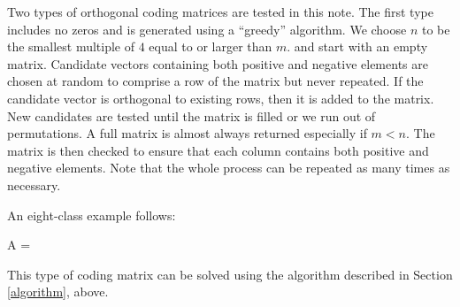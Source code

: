 
{\revision Two types of orthogonal coding matrices are tested in this note.
The first type includes no zeros and is generated
using a ``greedy'' algorithm.}
We choose $n$ to be the smallest multiple of $4$ equal to or larger than $m$.
and start with an empty matrix.
Candidate vectors containing both positive and negative elements 
are chosen at random to comprise a row of the matrix but never repeated.
If the candidate vector is orthogonal to existing rows, then it is added to the matrix.
New candidates are tested until the matrix is filled or we run out of permutations.
A full matrix is almost always returned especially if $m<n$.
The matrix is then checked to ensure that 
each column contains both positive and negative elements.
Note that the whole process can be repeated as many times as necessary.
{\revision An eight-class example follows:
\begin{eqnnon}
	A = 
\end{eqnnon}
This type of coding matrix can be solved using the algorithm described
in Section \ref{algorithm}, above.}

